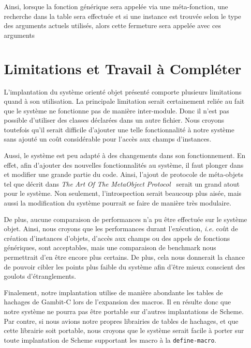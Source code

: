       Ainsi, lorsque la fonction générique sera appelée via une
      méta-fonction, une recherche dans la table sera effectuée et si
      une instance est trouvée selon le type des arguments actuels
      utilisés, alors cette fermeture sera appelée avec ces arguments
    



 
\section{Limitations et Travail à Compléter}
  L'implantation du système orienté objet présenté comporte plusieurs
  limitations quand à son utilisation. La principale limitation serait
  certainement reliée au fait que le système ne fonctionne pas de
  manière inter-module. Donc il n'est pas possible d'utiliser des
  classes déclarées dans un autre fichier. Nous croyons toutefois
  qu'il serait difficile d'ajouter une telle fonctionnalité à notre
  système sans ajouté un coût considérable pour l'accès aux champs
  d'instances.

  Aussi, le système est peu adapté à des changements dans son
  fonctionnement. En effet, afin d'ajouter des nouvelles
  fonctionnalités au système, il faut plonger dans et modifier une
  grande partie du code. Ainsi, l'ajout de protocole de méta-objets
  tel que décrit dans \textit{The Art Of The MetaObject
    Protocol}~\cite{AOMOP} serait un grand atout pour le système. Non
  seulement, l'introspection serait beaucoup plus aisée, mais aussi la
  modification du système pourrait se faire de manière très modulaire.

  De plus, aucune comparaison de performances n'a pu être effectuée
  sur le système objet. Ainsi, nous croyons que les performances
  durant l'exécution, \textit{i.e.} coût de création d'instances
  d'objets, d'accès aux champs ou des appels de fonctions génériques,
  sont acceptables, mais une comparaison de \og benchmark \fg nous
  permettrait d'en être encore plus certains. De plus, cela nous
  donnerait la chance de pouvoir cibler les points plus faible du
  système afin d'être mieux conscient des goulots d'étranglements.

  Finalement, notre implantation utilise de manière abondante les
  tables de hachages de Gambit-C lors de l'expansion des macros. Il en
  résulte donc que notre système ne pourra pas être portable sur
  d'autres implantations de Scheme. Par contre, si nous avions notre
  propres librairies de tables de hachages, et que cette librairie
  soit portable, nous croyons que le système serait facile à porter
  sur toute implantation de Scheme supportant les macro à la
  \texttt{define-macro}.

